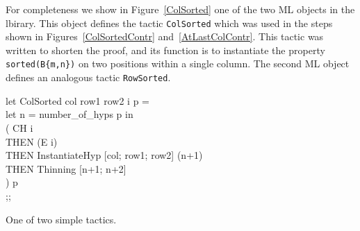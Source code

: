 For completeness we show in Figure~\ref{ColSorted} one of the two ML objects
in the lbirary.  This object defines the tactic {\tt ColSorted} which was
used in the steps shown in Figures~\ref{ColSortedContr}
and~\ref{AtLastColContr}.  This tactic was written to shorten the proof, and
its function is to instantiate the property {\tt sorted(B\{m,n\})} on two
positions within a single column.  The second ML object defines an analogous
tactic {\tt RowSorted}.
\begin{RuledFigure}
\begin{Screen}{1}{\SnapshotSize}
\N{}  let ColSorted col row1 row2 i p =\\{}
\N{}    let n = number\_of\_hyps p  in\\{}
\N{}    ( CH i \\{}
\N{}      THEN (E i)\\{}
\N{}      THEN InstantiateHyp [col; row1; row2] (n+1)\\{}
\N{}      THEN Thinning [n+1; n+2]\\{}
\N{}    ) p\\{}
\N{}  ;; 
\end{Screen}%
\caption{One of two simple tactics.}
\label{ColSorted} 
\end{RuledFigure}
